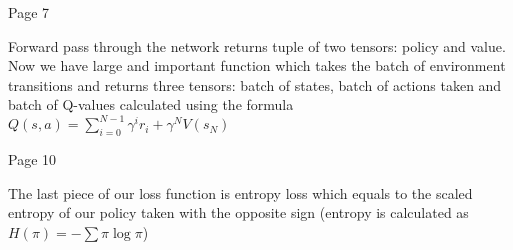 Page 7


Forward pass through the network returns tuple of two tensors: policy and
value. Now we have large and important function which takes the batch of
environment transitions and returns three tensors: batch of states, batch of
actions taken and batch of Q-values calculated using the
formula \begin{math}Q(s, a) = \sum_{i=0}^{N-1}\gamma^ir_i + \gamma^NV(s_N)\end{math}


Page 10

The last piece of our loss function is entropy loss which equals to the scaled
entropy of our policy taken with the opposite sign (entropy is calculated
as \begin{math}H(\pi) = -\sum \pi \log \pi\end{math})

